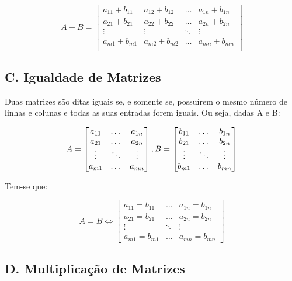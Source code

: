 \documentclass[twocolumn, 10pt]{extarticle}
\begin{document}
\[
A+B=
\left[
\begin{smallmatrix}
a_{11} + b_{11} & a_{12} + b_{12} & \dots & a_{1n} + b_{1n} \\
a_{21} + b_{21} & a_{22} + b_{22} & \dots & a_{2n} + b_{2n} \\
\vdots & \vdots & \ddots & \vdots \\
a_{m1} + b_{m1} & a_{m2} + b_{m2} & \dots & a_{mn} + b_{mn}\\
 &  &  &
\end{smallmatrix}\right]
\]

\subsection*{C. \quad Igualdade de Matrizes}

Duas matrizes são ditas iguais se, e somente se, possuírem o mesmo número de linhas e colunas e todas as suas entradas forem iguais. Ou seja, dadas A e B:

\[ 
A = 
\begin{bmatrix}
a_{11} & \dots & a_{1n} \\
a_{21} & \dots & a_{2n} \\
\vdots & \ddots & \vdots \\
a_{m1} & \dots & a_{mn} 

\end{bmatrix},  \\ 
B = 
\begin{bmatrix}
b_{11}  & \dots & b_{1n} \\
b_{21}  & \dots & b_{2n} \\
\vdots  & \ddots & \vdots \\
b_{m1}  & \dots & b_{mn} 

\end{bmatrix}
\]

Tem-se que:

\[ 
A = B \iff
\begin{bmatrix}
a_{11} = b_{11}  & \dots & a_{1n} = b_{1n} \\
a_{21} = b_{21}  & \dots & a_{2n} = b_{2n} \\
\vdots & \ddots  & \vdots \\
a_{m1} = b_{m1}  & \dots & a_{mn} = b_{mn} 

\end{bmatrix}
\]

\subsection*{D. \quad Multiplicação de Matrizes}
\end{document}
